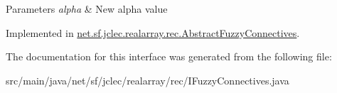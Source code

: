 \begin{DoxyParams}{Parameters}
{\em alpha} & New alpha value \\
\hline
\end{DoxyParams}


Implemented in \hyperlink{classnet_1_1sf_1_1jclec_1_1realarray_1_1rec_1_1_abstract_fuzzy_connectives_a45e699498fb9c6009e8ea066837862cc}{net.\-sf.\-jclec.\-realarray.\-rec.\-Abstract\-Fuzzy\-Connectives}.



The documentation for this interface was generated from the following file\-:\begin{DoxyCompactItemize}
\item 
src/main/java/net/sf/jclec/realarray/rec/I\-Fuzzy\-Connectives.\-java\end{DoxyCompactItemize}
